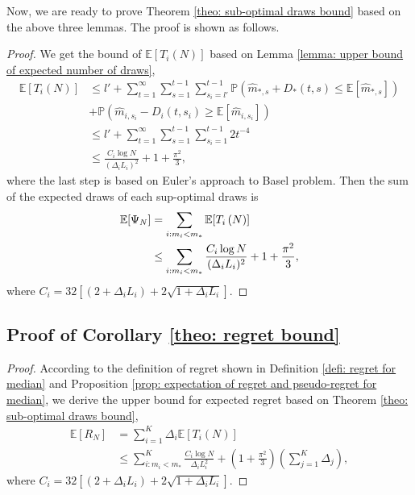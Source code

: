 Now, we are ready to prove Theorem \ref{theo: sub-optimal draws bound} based on the above three lemmas. The proof is shown as follows.

\SubOptDrawsBound*

\begin{proof}

    We get the bound of $\mathbb{E}[T_i\left(N\right)]$ based on Lemma \ref{lemma: upper bound of expected number of draws},
    \begin{align}
        \mathbb{E}[T_i\left(N\right)] &\leq l' + \sum_{t = 1}^\infty \sum_{s = 1}^{t-1} \sum_{s_i = l'}^{t-1} \mathbb{P}\left(\hat{m}_{*, s} +  D_*(t, s) \leq  \mathbb{E}[\hat{m}_{*, s}]\right)\nonumber \\ & + \mathbb{P}\left(\hat{m}_{i, s_i} -  D_i(t, s_i) \geq \mathbb{E}[\hat{m}_{i, s_i}]\right)\\
        & \leq l' + \sum_{t = 1}^\infty \sum_{s = 1}^{t-1} \sum_{s_i = 1}^{t-1} 2 t^{-4}\\
        & \leq \frac{ C_{i} \log N}{(\Delta_i L_{i})^2}  + 1 + \frac{\pi^2}{3},
    \end{align}
    where the last step is based on Euler's approach to Basel problem. Then the sum of the expected draws of each sup-optimal draws is
    \begin{align}
        \mathbb{E}[\Psi_N] &= \sum_{i: m_i < m_\ast} \mathbb{E}[T_i\left(N\right)] \nonumber \\
        \label{equ: sub-optimal draws bound proof last step}
        &\leq \sum_{i: m_i < m_\ast} \frac{ C_{i} \log N}{(\Delta_i L_{i})^2}  + 1 + \frac{\pi^2}{3},
    \end{align}
where $ C_{i} = 32 \left[(2 + \Delta_i L_{i}) + 2\sqrt{1 + \Delta_i L_{i}}\right]$.

\end{proof}

\subsection{Proof of Corollary \ref{theo: regret bound}}

\begin{proof}
According to the definition of regret shown in Definition \ref{defi: regret for median} and Proposition \ref{prop: expectation of regret and pseudo-regret for median}, we derive the upper bound for expected regret based on Theorem \ref{theo: sub-optimal draws bound},
\begin{align}
    \mathbb{E}[R_N]
    &= \sum_{i = 1}^K \Delta_i \mathbb{E}[T_i\left(N\right)] \nonumber \\
    & \leq
          \sum_{i: m_i < m_\ast}^K \frac{  C_{i} \log N}{\Delta_i L_{i}^2}  + \left(1 + \frac{\pi^2}{3}\right) \left(\sum_{j=1}^K \Delta_{j}\right),
\end{align}
where $ C_{i} = 32 \left[(2 + \Delta_i L_{i}) + 2\sqrt{1 + \Delta_i L_{i}}\right]$.
\end{proof}

